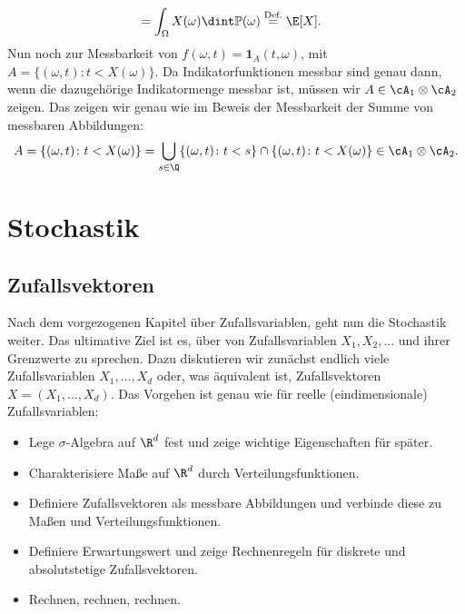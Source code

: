 \begin{beispiel}
\begin{enumerate}[label=(\roman*)]
\begin{align*}
			& = \int_{\Omega} X(\omega) \dint \mathbb{P}(\omega) \overset{\text{Def.}}{=} \E[X].
		\end{align*}
		Nun noch zur Messbarkeit von $f(\omega,t) = \mathbf{1}_A(t,\omega)$, mit $A = \{ ( \omega,t) \colon t < X(\omega) \}$. Da Indikatorfunktionen messbar sind genau dann, wenn die dazugeh\"orige Indikatormenge messbar ist, m\"ussen wir $A\in \cA_1 \otimes \cA_2$ zeigen. Das zeigen wir genau wie im Beweis der Messbarkeit der Summe von messbaren Abbildungen:
		\begin{gather*}
			A = \{ (\omega,t) \colon t < X(\omega) \} =  \bigcup_{s \in \Q} \{ (\omega,t)\colon t < s \} \cap \{ (\omega,t) \colon t < X(\omega) \} \in \cA_1 \otimes \cA_2.
		\end{gather*}
	\end{enumerate}
\end{beispiel}

\begin{satz}\label{fubini}
\end{satz}

\chapter{Stochastik}



\section{Zufallsvektoren}
Nach dem vorgezogenen Kapitel \"uber Zufallsvariablen, geht nun die Stochastik weiter. Das ultimative Ziel ist es, \"uber von Zufallsvariablen $X_1, X_2, ...$ und ihrer Grenzwerte zu sprechen. Dazu diskutieren wir zun\"achst endlich viele Zufallsvariablen $X_1, ..., X_d$ oder, was \"aquivalent ist, Zufallsvektoren $X=(X_1,...,X_d)$. Das Vorgehen ist genau wie f\"ur reelle (eindimensionale) Zufallsvariablen: 
\begin{itemize}
	\item Lege $\sigma$-Algebra auf $\R^d$ fest und zeige wichtige Eigenschaften f\"ur sp\"ater.
	\item Charakterisiere Maße auf $\R^d$ durch Verteilungsfunktionen.
	\item Definiere Zufallsvektoren als messbare Abbildungen und verbinde diese zu Ma\ss en und Verteilungsfunktionen. 
	\item Definiere Erwartungswert und zeige Rechnenregeln f\"ur diskrete und absolutstetige Zufallsvektoren.
	\item Rechnen, rechnen, rechnen.
\end{itemize}

